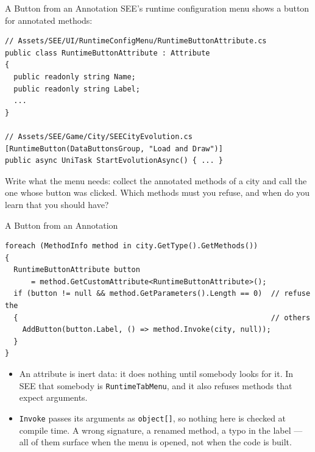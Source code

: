 \begin{exerciseframe}{A Button from an Annotation}
  SEE's runtime configuration menu shows a button for annotated methods:
  \vspace{1ex}

  \begin{lstlisting}[basicstyle=\scriptsize\ttfamily]
// Assets/SEE/UI/RuntimeConfigMenu/RuntimeButtonAttribute.cs
public class RuntimeButtonAttribute : Attribute
{
  public readonly string Name;
  public readonly string Label;
  ...
}

// Assets/SEE/Game/City/SEECityEvolution.cs
[RuntimeButton(DataButtonsGroup, "Load and Draw")]
public async UniTask StartEvolutionAsync() { ... }
  \end{lstlisting}
  \vspace{1ex}

  Write what the menu needs: collect the annotated methods of a city and call
  the one whose button was clicked. Which methods must you refuse, and when do
  you learn that you should have?
\end{exerciseframe}

\begin{solutionframe}{A Button from an Annotation}
  \begin{lstlisting}[basicstyle=\scriptsize\ttfamily]
foreach (MethodInfo method in city.GetType().GetMethods())
{
  RuntimeButtonAttribute button
      = method.GetCustomAttribute<RuntimeButtonAttribute>();
  if (button != null && method.GetParameters().Length == 0)  // refuse the
  {                                                          // others
    AddButton(button.Label, () => method.Invoke(city, null));
  }
}
  \end{lstlisting}
  \vspace{0.5ex}

  \begin{itemize}
    \item An attribute is inert data: it does nothing until somebody looks for
      it. In SEE that somebody is \texttt{RuntimeTabMenu}, and it also refuses
      methods that expect arguments.
    \item \texttt{Invoke} passes its arguments as \texttt{object[]}, so nothing
      here is checked at compile time. A wrong signature, a renamed method, a
      typo in the label --- all of them surface when the menu is opened, not
      when the code is built.
  \end{itemize}
\end{solutionframe}

